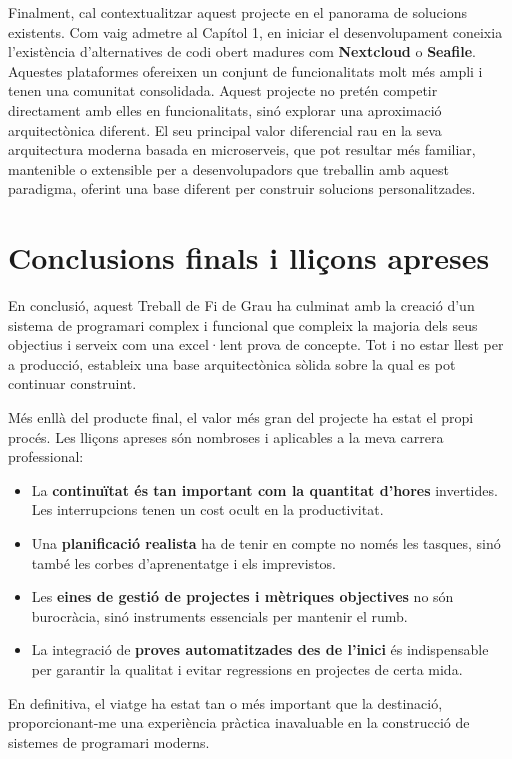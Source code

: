 Finalment, cal contextualitzar aquest projecte en el panorama de solucions existents. Com vaig admetre al Capítol 1, en iniciar el desenvolupament coneixia l'existència d'alternatives de codi obert madures com \textbf{Nextcloud} o \textbf{Seafile}. Aquestes plataformes ofereixen un conjunt de funcionalitats molt més ampli i tenen una comunitat consolidada. Aquest projecte no pretén competir directament amb elles en funcionalitats, sinó explorar una aproximació arquitectònica diferent. El seu principal valor diferencial rau en la seva arquitectura moderna basada en microserveis, que pot resultar més familiar, mantenible o extensible per a desenvolupadors que treballin amb aquest paradigma, oferint una base diferent per construir solucions personalitzades.

\section{Conclusions finals i lliçons apreses}

En conclusió, aquest Treball de Fi de Grau ha culminat amb la creació d'un sistema de programari complex i funcional que compleix la majoria dels seus objectius i serveix com una excel·lent prova de concepte. Tot i no estar llest per a producció, estableix una base arquitectònica sòlida sobre la qual es pot continuar construint.

Més enllà del producte final, el valor més gran del projecte ha estat el propi procés. Les lliçons apreses són nombroses i aplicables a la meva carrera professional:
\begin{itemize}
    \item La \textbf{continuïtat és tan important com la quantitat d'hores} invertides. Les interrupcions tenen un cost ocult en la productivitat.
    \item Una \textbf{planificació realista} ha de tenir en compte no només les tasques, sinó també les corbes d'aprenentatge i els imprevistos.
    \item Les \textbf{eines de gestió de projectes i mètriques objectives} no són burocràcia, sinó instruments essencials per mantenir el rumb.
    \item La integració de \textbf{proves automatitzades des de l'inici} és indispensable per garantir la qualitat i evitar regressions en projectes de certa mida.
\end{itemize}

En definitiva, el viatge ha estat tan o més important que la destinació, proporcionant-me una experiència pràctica inavaluable en la construcció de sistemes de programari moderns.
